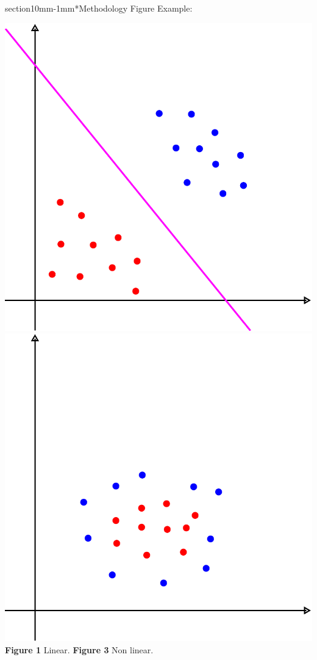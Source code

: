 \documentclass[a0,portrait]{a0poster}
\makeatletter
\renewcommand{\LARGE}{\fontsize{50}{70}\selectfont\bfseries} %
\renewcommand{\section}{\@startsection%
  {section}{1}{0mm}{-\baselineskip}{1mm}{\LARGE\color{myred}\bfseries}}
\makeatother
\begin{document}
\begin{multicols}{2}
\section*{Methodology}
Figure Example:
\begin{center}
	\includegraphics[scale=0.5]{svmfig2_margemrigida-eps-converted-to.pdf}\hspace{1.5cm}
	\hspace{1.5cm}\includegraphics[scale=0.5]{svmfig2_naolinear-eps-converted-to.pdf}
	\\
	\hspace{2cm}\textbf{Figure 1} \textcolor{myblue}{Linear.}\hspace{2cm}
	\hspace{1.5cm}\textbf{Figure 3}  \textcolor{myblue}{Non linear.}
\end{center}

\end{multicols}
\end{document}
